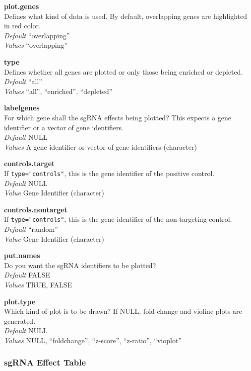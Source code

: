\documentclass[]{article}
\begin{document}
\textbf{plot.genes}\\
Defines what kind of data is used. By default, overlapping genes are
highlighted in red color.\\
\emph{Default} ``overlapping''\\
\emph{Values} ``overlapping''

\textbf{type}\\
Defines whether all genes are plotted or only those being enriched or
depleted.\\
\emph{Default} ``all''\\
\emph{Values} ``all'', ``enriched'', ``depleted''

\textbf{labelgenes}\\
For which gene shall the sgRNA effects being plotted? This expects a
gene identifier or a vector of gene identifiers.\\
\emph{Default} NULL\\
\emph{Values} A gene identifier or vector of gene identifiers
(character)

\textbf{controls.target}\\
If \texttt{type="controls"}, this is the gene identifier of the positive
control.\\
\emph{Default} NULL\\
\emph{Value} Gene Identifier (character)

\textbf{controls.nontarget}\\
If \texttt{type="controls"}, this is the gene identifier of the
non-targeting control.\\
\emph{Default} ``random''\\
\emph{Value} Gene Identifier (character)

\textbf{put.names}\\
Do you want the sgRNA identifiers to be plotted?\\
\emph{Default} FALSE\\
\emph{Values} TRUE, FALSE

\textbf{plot.type}\\
Which kind of plot is to be drawn? If NULL, fold-change and violine
plots are generated.\\
\emph{Default} NULL\\
\emph{Values} NULL, ``foldchange'', ``z-score'', ``z-ratio'',
``vioplot''

\subsubsection{sgRNA Effect Table}\label{sgrna-effect-table}
\end{document}

